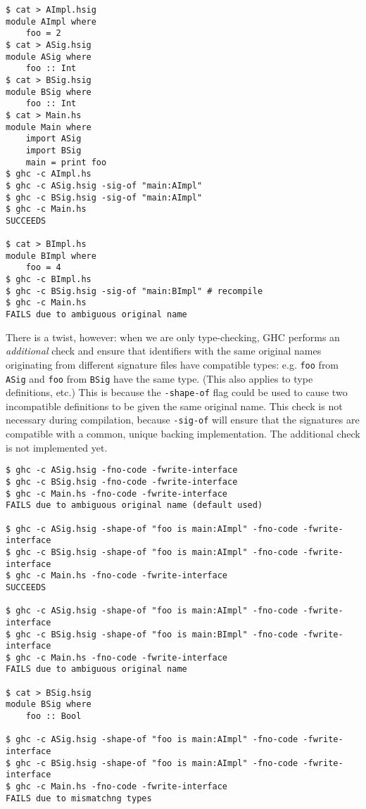 \documentclass{article}
\newcommand{\Red}[1]{{\color{red} #1}}
\begin{document}
\begin{verbatim}
$ cat > AImpl.hsig
module AImpl where
    foo = 2
$ cat > ASig.hsig
module ASig where
    foo :: Int
$ cat > BSig.hsig
module BSig where
    foo :: Int
$ cat > Main.hs
module Main where
    import ASig
    import BSig
    main = print foo
$ ghc -c AImpl.hs
$ ghc -c ASig.hsig -sig-of "main:AImpl"
$ ghc -c BSig.hsig -sig-of "main:AImpl"
$ ghc -c Main.hs
SUCCEEDS

$ cat > BImpl.hs
module BImpl where
    foo = 4
$ ghc -c BImpl.hs
$ ghc -c BSig.hsig -sig-of "main:BImpl" # recompile
$ ghc -c Main.hs
FAILS due to ambiguous original name
\end{verbatim}

There is a twist, however: when we are only type-checking, GHC
performs an \emph{additional} check and ensure that identifiers with the
same original names originating from different signature files have
compatible types: e.g.  \texttt{foo} from \texttt{ASig} and \texttt{foo}
from \texttt{BSig} have the same type. (This also applies to type
definitions, etc.)  This is because the \texttt{-shape-of} flag could be
used to cause two incompatible definitions to be given the same original
name.  This check is not necessary during compilation, because
\texttt{-sig-of} will ensure that the signatures are compatible with a
common, unique backing implementation.  \Red{The additional check is not implemented yet.}

\begin{verbatim}
$ ghc -c ASig.hsig -fno-code -fwrite-interface
$ ghc -c BSig.hsig -fno-code -fwrite-interface
$ ghc -c Main.hs -fno-code -fwrite-interface
FAILS due to ambiguous original name (default used)

$ ghc -c ASig.hsig -shape-of "foo is main:AImpl" -fno-code -fwrite-interface
$ ghc -c BSig.hsig -shape-of "foo is main:AImpl" -fno-code -fwrite-interface
$ ghc -c Main.hs -fno-code -fwrite-interface
SUCCEEDS

$ ghc -c ASig.hsig -shape-of "foo is main:AImpl" -fno-code -fwrite-interface
$ ghc -c BSig.hsig -shape-of "foo is main:BImpl" -fno-code -fwrite-interface
$ ghc -c Main.hs -fno-code -fwrite-interface
FAILS due to ambiguous original name

$ cat > BSig.hsig
module BSig where
    foo :: Bool

$ ghc -c ASig.hsig -shape-of "foo is main:AImpl" -fno-code -fwrite-interface
$ ghc -c BSig.hsig -shape-of "foo is main:AImpl" -fno-code -fwrite-interface
$ ghc -c Main.hs -fno-code -fwrite-interface
FAILS due to mismatchng types
\end{verbatim}
\end{document}
